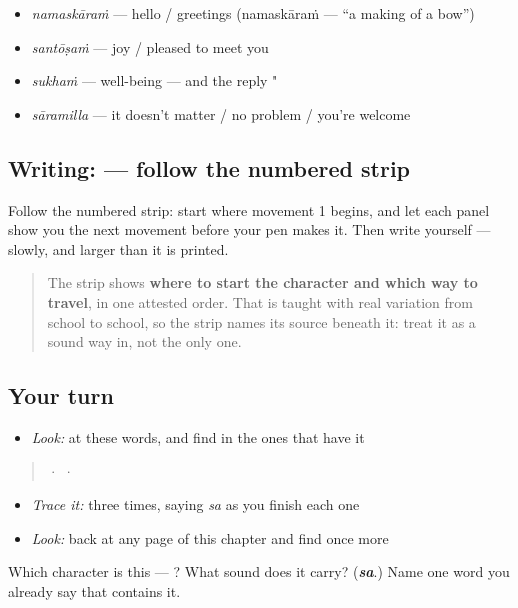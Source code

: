 \begin{itemize}
\raggedright
  \item \textbf{} \emph{namaskāraṁ} — hello / greetings (namaskāraṁ — \textquotedblleft{}a making of a bow\textquotedblright{})
  \item \textbf{} \emph{santōṣaṁ} — joy / pleased to meet you
  \item \textbf{} \emph{sukhaṁ} — well-being — and the reply "
  \item \textbf{} \emph{sāramilla} — it doesn't matter / no problem / you're welcome
\end{itemize}

\subsection*{Writing:  — follow the numbered strip}

Follow the numbered strip: start where movement 1 begins, and let each panel show you the next movement before your pen makes it. Then write  yourself — slowly, and larger than it is printed.

\begin{quote}
The strip shows \textbf{where to start the character and which way to travel}, in one attested order. That is taught with real variation from school to school, so the strip names its source beneath it: treat it as a sound way in, not the only one.
\end{quote}

\subsection*{Your turn}
\begin{itemize}
\raggedright
  \item \emph{Look:} at these words, and find  in the ones that have it
\end{itemize}

\begin{quote}
  ·    ·  
\end{quote}

\begin{itemize}
\raggedright
  \item \emph{Trace it:}  three times, saying \emph{sa} as you finish each one
  \item \emph{Look:} back at any page of this chapter and find  once more
\end{itemize}

\begin{tcolorbox}[breakable,colback=teal!4,colframe=teal!35!black,title={Before you move on}]
Which character is this — ? What sound does it carry? (\emph{\textbf{sa}}.) Name one word you already say that contains it.
\end{tcolorbox}
